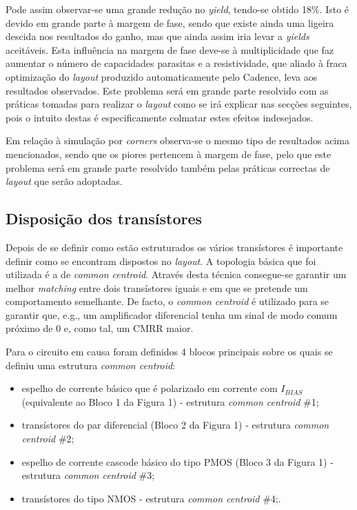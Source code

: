 \documentclass[11pt]{article}
\numberwithin{equation}{section}
\begin{document}
Pode assim observar-se uma grande redução no \textit{yield}, tendo-se obtido 18\%. Isto é devido em grande parte à margem de fase, sendo que existe ainda uma ligeira descida nos resultados do ganho, mas que ainda assim iria levar a \textit{yields} aceitáveis. Esta influência na margem de fase deve-se à multiplicidade que faz aumentar o número de capacidades parasitas e a resistividade, que aliado à fraca optimização do \textit{layout} produzido automaticamente pelo Cadence, leva aos resultados observados. Este problema será em grande parte resolvido com as práticas tomadas para realizar o \textit{layout} como se irá explicar nas secções seguintes, pois o intuito destas é especificamente colmatar estes efeitos indesejados.

Em relação à simulação por \textit{corners} observa-se o mesmo tipo de resultados acima mencionados, sendo que os piores pertencem à margem de fase, pelo que este problema será em grande parte resolvido também pelas práticas correctas de \textit{layout} que serão adoptadas.

\subsection{Disposição dos transístores}

Depois de se definir como estão estruturados os vários transístores é importante definir como se encontram dispostos no \textit{layout}. A topologia básica que foi utilizada é a de \textit{common centroid}. Através desta técnica consegue-se garantir um melhor \textit{matching} entre dois transístores iguais e em que se pretende um comportamento semelhante. De facto, o \textit{common centroid} é utilizado para se garantir que, e.g., um amplificador diferencial tenha um sinal de modo comum próximo de 0 e, como tal, um CMRR maior.

Para o circuito em causa foram definidos 4 blocos principais sobre os quais se definiu uma estrutura \textit{common centroid}:

\vspace{-2mm}

\begin{itemize}
	\item espelho de corrente básico que é polarizado em corrente com $I_{BIAS}$ (equivalente ao Bloco 1 da Figura 1) - estrutura \textit{common centroid} \#1;
	\vspace{-2mm}
	\item transístores do par diferencial (Bloco 2 da Figura 1) - estrutura \textit{common centroid} \#2;
	\vspace{-2mm}
	\item espelho de corrente cascode básico do tipo PMOS (Bloco 3 da Figura 1) - estrutura \textit{common centroid} \#3;
	\vspace{-2mm}
	\item transístores do tipo NMOS - estrutura \textit{common centroid} \#4;.
\end{itemize}
\end{document}
